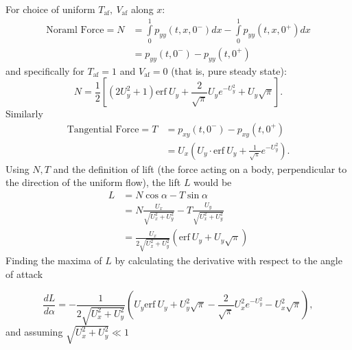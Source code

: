 For choice of uniform $\displaystyle T_{\text{af}} ,\ V_{\text{af}}$ along $\displaystyle x$:
\begin{equation*}
\begin{aligned}
\text{Noraml Force} =N & =\int\limits _{0}^{1} p_{yy}\left( t,x,0^{-}\right) dx-\int\limits _{0}^{1} p_{yy}\left( t,x,0^{+}\right) dx\\
 & =p_{yy}\left( t,0^{-}\right) -p_{yy}\left( t,0^{+}\right)
\end{aligned}
\end{equation*}
and specifically for $\displaystyle T_{\text{af}} =1$ and $\displaystyle V_{\text{af}} =0$ (that is, pure steady state):
\begin{equation}\label{eq:noraml_force}
N
=
\frac{1}{2}\left[
\left( 2U_{y}^{2}+1 \right) \mathrm{erf} \ U_{y} + 
\frac{2}{\sqrt{\pi }} U_{y} e^{-U_{y}^{2}} +U_{y}\sqrt{\pi }
\right]
.
\end{equation}
Similarly
\begin{equation}\label{eq:tangential_force}
    \begin{aligned}
        \text{Tangential Force} =T & =p_{xy}\left( t,0^{-}\right) -p_{xy}\left( t,0^{+}\right)\\
 & =U_{x}\left( U_{y} \cdotp \mathrm{erf} \ U_{y} +\frac{1}{\mathrm{\sqrt{\pi }}} e^{- U_{y}^{2}}\right)
 .
    \end{aligned}
\end{equation}
Using $\displaystyle N,T$ and the definition of lift (the force acting on a body, perpendicular to the direction of the uniform flow), the lift $\displaystyle L$ would be
\begin{equation}\label{eq:lift}
\begin{aligned}
L & =N\cos \alpha -T\sin \alpha \\
 & =N\frac{U_{x}}{\sqrt{U_{x}^{2} +U_{y}^{2}}} -T\frac{U_{y}}{\sqrt{U_{x}^{2} +U_{y}^{2}}}\\
 & =\frac{U_{x}}{2\sqrt{U_{x}^{2} +U_{y}^{2}}}\left(\mathrm{erf\ } U_{y} +U_{y}\sqrt{\pi }\right)
\end{aligned}
\end{equation}
Finding the maxima of $L$ by calculating the derivative with respect to the angle of attack

\begin{equation}
\frac{dL}{d\alpha } =-\frac{1}{2\sqrt{U_{x}^{2} +U_{y}^{2}}}\left( U_{y}\mathrm{erf\ } U_{y} +U_{y}^{2}\sqrt{\pi } -\frac{2}{\sqrt{\pi }} U_{x}^{2} e^{- U_{y}^{2}} -U_{x}^{2}\sqrt{\pi }\right)
,
\end{equation}
and assuming $\sqrt{U_x^2+U_y^2}\ll1$ 


